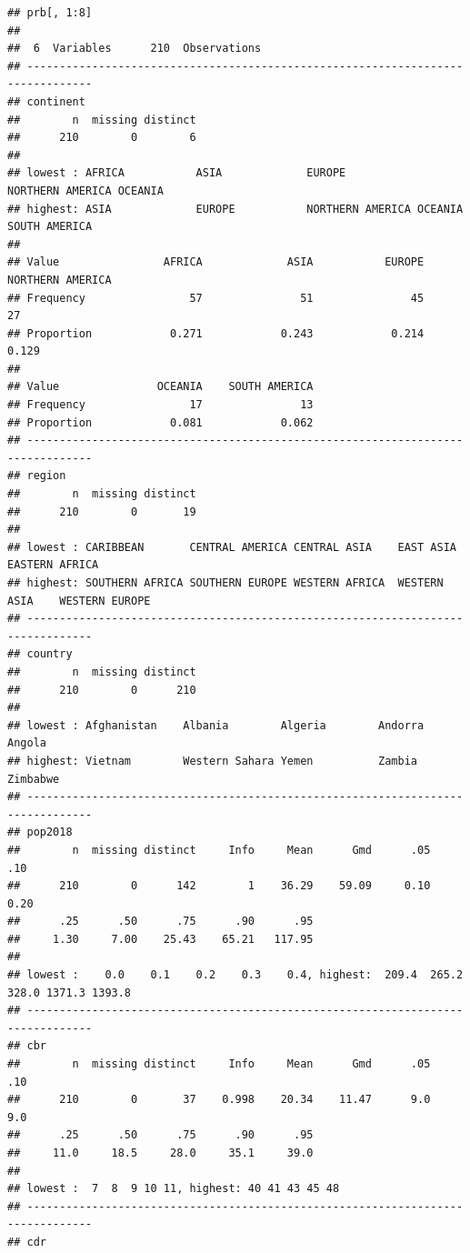 \documentclass[
]{book}
\begin{document}
\begin{verbatim}
## prb[, 1:8] 
## 
##  6  Variables      210  Observations
## --------------------------------------------------------------------------------
## continent 
##        n  missing distinct 
##      210        0        6 
## 
## lowest : AFRICA           ASIA             EUROPE           NORTHERN AMERICA OCEANIA         
## highest: ASIA             EUROPE           NORTHERN AMERICA OCEANIA          SOUTH AMERICA   
##                                                                               
## Value                AFRICA             ASIA           EUROPE NORTHERN AMERICA
## Frequency                57               51               45               27
## Proportion            0.271            0.243            0.214            0.129
##                                             
## Value               OCEANIA    SOUTH AMERICA
## Frequency                17               13
## Proportion            0.081            0.062
## --------------------------------------------------------------------------------
## region 
##        n  missing distinct 
##      210        0       19 
## 
## lowest : CARIBBEAN       CENTRAL AMERICA CENTRAL ASIA    EAST ASIA       EASTERN AFRICA 
## highest: SOUTHERN AFRICA SOUTHERN EUROPE WESTERN AFRICA  WESTERN ASIA    WESTERN EUROPE 
## --------------------------------------------------------------------------------
## country 
##        n  missing distinct 
##      210        0      210 
## 
## lowest : Afghanistan    Albania        Algeria        Andorra        Angola        
## highest: Vietnam        Western Sahara Yemen          Zambia         Zimbabwe      
## --------------------------------------------------------------------------------
## pop2018 
##        n  missing distinct     Info     Mean      Gmd      .05      .10 
##      210        0      142        1    36.29    59.09     0.10     0.20 
##      .25      .50      .75      .90      .95 
##     1.30     7.00    25.43    65.21   117.95 
## 
## lowest :    0.0    0.1    0.2    0.3    0.4, highest:  209.4  265.2  328.0 1371.3 1393.8
## --------------------------------------------------------------------------------
## cbr 
##        n  missing distinct     Info     Mean      Gmd      .05      .10 
##      210        0       37    0.998    20.34    11.47      9.0      9.0 
##      .25      .50      .75      .90      .95 
##     11.0     18.5     28.0     35.1     39.0 
## 
## lowest :  7  8  9 10 11, highest: 40 41 43 45 48
## --------------------------------------------------------------------------------
## cdr 

\end{verbatim}
\end{document}

